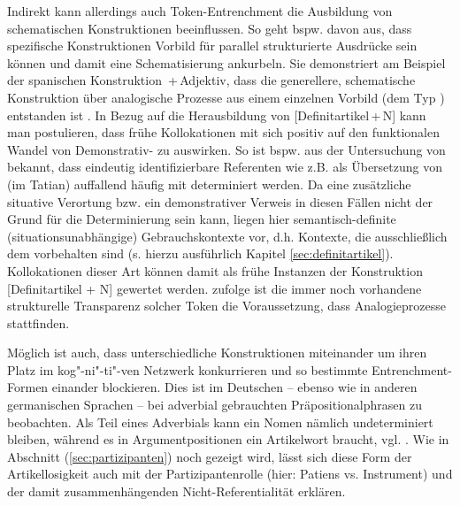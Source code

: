 Indirekt kann allerdings auch Token-Entrenchment die Ausbildung von schematischen Konstruktionen beeinflussen. So geht bspw. \textcite[96]{Bybee2010} davon aus, dass spezifische Konstruktionen Vorbild für parallel strukturierte Ausdrücke sein können und damit eine Schematisierung ankurbeln. Sie demonstriert am Beispiel der spanischen Konstruktion   \,+\,Adjektiv, dass die generellere, schematische  Konstruktion   über analogische Prozesse  aus einem einzelnen Vorbild (dem Typ ) entstanden ist \parencite[72]{Bybee2010}. In Bezug auf die Herausbildung von [Definitartikel\,+\,N] kann man postulieren, dass frühe Kollokationen mit  sich positiv auf den funktionalen Wandel von Demonstrativ-  zu  auswirken. So ist bspw. aus der Untersuchung von \textcite{Oubouzar1992} bekannt, dass eindeutig identifizierbare Referenten wie  z.B.  als Übersetzung von  (im Tatian) auffallend häufig mit  determiniert werden. Da eine zusätzliche situative Verortung bzw. ein demonstrativer Verweis in diesen Fällen nicht der Grund für die Determinierung sein kann, liegen hier semantisch-definite (situationsunabhängige) Gebrauchskontexte vor, d.h. Kontexte, die ausschließlich dem  vorbehalten sind (s. hierzu ausführlich Kapitel \ref{sec:definitartikel}). Kollokationen dieser Art können damit als frühe Instanzen der Konstruktion   [Definitartikel + N] gewertet werden. \textcite[96]{Bybee2010} zufolge ist die immer noch vorhandene strukturelle Transparenz solcher Token die Voraussetzung, dass Analogieprozesse  stattfinden.   

Möglich ist auch, dass unterschiedliche Konstruktionen miteinander um ihren Platz im kog"-ni"-ti"-ven Netzwerk konkurrieren und so bestimmte Entrenchment-Formen einander blockieren. Dies ist im Deutschen -- ebenso wie in anderen germanischen Sprachen \parencite[s.][]{Himmelmann1998} -- bei adverbial 
 gebrauchten Präpositionalphrasen zu beobachten. Als Teil eines Adverbials  kann ein Nomen nämlich undeterminiert bleiben, während es in Argumentpositionen ein Artikelwort braucht, vgl. . Wie in Abschnitt (\ref{sec:partizipanten}) noch gezeigt wird, lässt sich diese Form der Artikellosigkeit auch mit der Partizipantenrolle 
 (hier: Patiens vs. Instrument) und der damit zusammenhängenden Nicht-Referentialität  erklären.  

